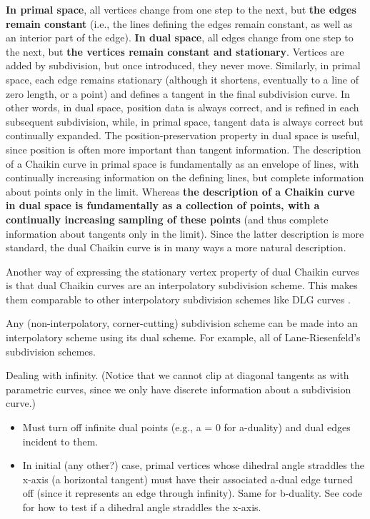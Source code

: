 \documentclass[12pt]{article}
\begin{document}
{\bf In primal space}, all vertices change from one step to the next,
but {\bf the edges remain constant} (i.e., the lines defining the edges remain
constant, as well as an interior part of the edge).
{\bf In dual space}, all edges change from one step to the next, but 
{\bf the vertices remain constant and stationary}.
Vertices are added by subdivision, but once introduced, they never move.
Similarly, in primal space, each edge remains stationary (although it shortens,
eventually to a line of zero length, or a point) and defines a tangent in the
final subdivision curve.
In other words, in dual space, position data is always correct, 
and is refined in each subsequent subdivision,
while, in primal space, tangent data is always correct but continually expanded.
The position-preservation property in dual space is useful,
since position is often more important than tangent information.
The description of a Chaikin curve in primal space is fundamentally
as an envelope of lines, with continually increasing information on the defining lines,
but complete information about points only in the limit.
Whereas {\bf the description of a Chaikin curve in dual space is fundamentally
as a collection of points, with a continually increasing sampling of these
points} (and thus complete information about tangents only in the limit).
Since the latter description is more standard, the dual Chaikin curve is
in many ways a more natural description.

Another way of expressing the stationary vertex property of dual Chaikin curves 
is that dual Chaikin curves are an interpolatory subdivision scheme.
This makes them comparable to other interpolatory subdivision schemes
like DLG curves \cite{dyn87}.

\begin{claim}
Any (non-interpolatory, corner-cutting) subdivision scheme can be made into an interpolatory scheme using
its dual scheme.
For example, all of Lane-Riesenfeld's subdivision schemes.
\end{claim}

Dealing with infinity.
(Notice that we cannot clip at diagonal tangents as with parametric curves,
since we only have discrete information about a subdivision curve.)

\begin{itemize}
\item	Must turn off infinite dual points (e.g., a = 0 for a-duality)
	and dual edges incident to them.
\item	In initial (any other?) case, primal vertices whose dihedral angle
	straddles the x-axis (a horizontal tangent)
	must have their associated a-dual edge turned off (since
	it represents an edge through infinity).
	Same for b-duality.
	See code for how to test if a dihedral angle straddles the x-axis.
\end{itemize}
\end{document}
